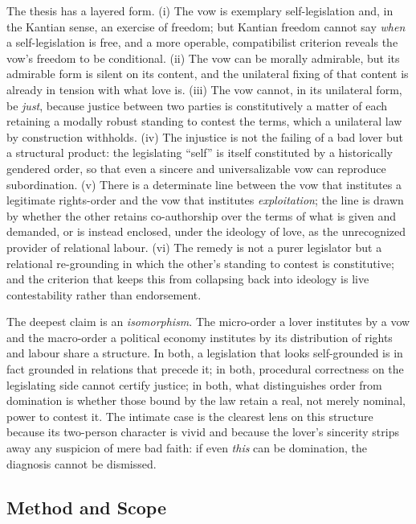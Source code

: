 The thesis has a layered form. (i) The vow is exemplary self-legislation and, in the Kantian sense, an exercise of freedom; but Kantian freedom cannot say \emph{when} a self-legislation is free, and a more operable, compatibilist criterion reveals the vow's freedom to be conditional. (ii) The vow can be morally admirable, but its admirable form is silent on its content, and the unilateral fixing of that content is already in tension with what love is. (iii) The vow cannot, in its unilateral form, be \emph{just}, because justice between two parties is constitutively a matter of each retaining a modally robust standing to contest the terms, which a unilateral law by construction withholds. (iv) The injustice is not the failing of a bad lover but a structural product: the legislating ``self'' is itself constituted by a historically gendered order, so that even a sincere and universalizable vow can reproduce subordination. (v) There is a determinate line between the vow that institutes a legitimate rights-order and the vow that institutes \emph{exploitation}; the line is drawn by whether the other retains co-authorship over the terms of what is given and demanded, or is instead enclosed, under the ideology of love, as the unrecognized provider of relational labour. (vi) The remedy is not a purer legislator but a relational re-grounding in which the other's standing to contest is constitutive; and the criterion that keeps this from collapsing back into ideology is live contestability rather than endorsement.

The deepest claim is an \emph{isomorphism}. The micro-order a lover institutes by a vow and the macro-order a political economy institutes by its distribution of rights and labour share a structure. In both, a legislation that looks self-grounded is in fact grounded in relations that precede it; in both, procedural correctness on the legislating side cannot certify justice; in both, what distinguishes order from domination is whether those bound by the law retain a real, not merely nominal, power to contest it. The intimate case is the clearest lens on this structure because its two-person character is vivid and because the lover's sincerity strips away any suspicion of mere bad faith: if even \emph{this} can be domination, the diagnosis cannot be dismissed.

\subsection{Method and Scope}

